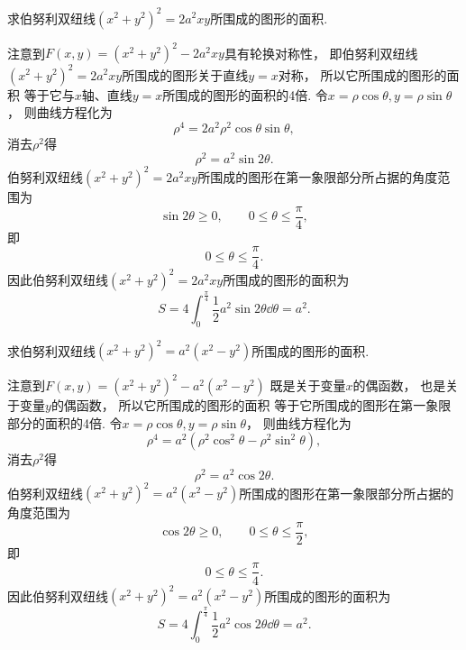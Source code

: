 \begin{example}
求伯努利双纽线\((x^2+y^2)^2 = 2 a^2 x y\)所围成的图形的面积.
\begin{solution}
注意到\(F(x,y) = (x^2+y^2)^2 - 2 a^2 x y\)具有轮换对称性，
即伯努利双纽线\((x^2+y^2)^2 = 2 a^2 x y\)所围成的图形关于直线\(y=x\)对称，
所以它所围成的图形的面积
等于它与\(x\)轴、直线\(y=x\)所围成的图形的面积的4倍.
令\(x = \rho \cos\theta,
y = \rho \sin\theta\)，
则曲线方程化为\begin{equation*}
	\rho^4 = 2 a^2 \rho^2 \cos\theta \sin\theta,
\end{equation*}
消去\(\rho^2\)得\begin{equation*}
	\rho^2 = a^2 \sin2\theta.
\end{equation*}
伯努利双纽线\((x^2+y^2)^2 = 2 a^2 x y\)所围成的图形在第一象限部分所占据的角度范围为\begin{equation*}
	\sin2\theta \geq 0,
	\qquad
	0 \leq \theta \leq \frac\pi4,
\end{equation*}
即\begin{equation*}
	0 \leq \theta \leq \frac\pi4.
\end{equation*}
因此伯努利双纽线\((x^2+y^2)^2 = 2 a^2 x y\)所围成的图形的面积为\begin{equation*}
	S = 4 \int_0^{\frac\pi4} \frac12 a^2 \sin2\theta \dd\theta
	= a^2.
\end{equation*}
\end{solution}
\end{example}
\begin{example}
求伯努利双纽线\((x^2+y^2)^2 = a^2(x^2-y^2)\)所围成的图形的面积.
\begin{solution}
注意到\(F(x,y) = (x^2+y^2)^2 - a^2(x^2-y^2)\)
既是关于变量\(x\)的偶函数，
也是关于变量\(y\)的偶函数，
所以它所围成的图形的面积
等于它所围成的图形在第一象限部分的面积的4倍.
令\(x = \rho \cos\theta,
y = \rho \sin\theta\)，
则曲线方程化为\begin{equation*}
	\rho^4 = a^2 (\rho^2 \cos^2\theta - \rho^2 \sin^2\theta),
\end{equation*}
消去\(\rho^2\)得\begin{equation*}
	\rho^2 = a^2 \cos2\theta.
\end{equation*}
伯努利双纽线\((x^2+y^2)^2 = a^2(x^2-y^2)\)所围成的图形在第一象限部分所占据的角度范围为\begin{equation*}
	\cos2\theta \geq 0,
	\qquad
	0 \leq \theta \leq \frac\pi2,
\end{equation*}
即\begin{equation*}
	0 \leq \theta \leq \frac\pi4.
\end{equation*}
因此伯努利双纽线\((x^2+y^2)^2 = a^2(x^2-y^2)\)所围成的图形的面积为\begin{equation*}
	S = 4 \int_0^{\frac\pi4} \frac12 a^2 \cos2\theta \dd\theta
	= a^2.
\end{equation*}
\end{solution}
\end{example}
